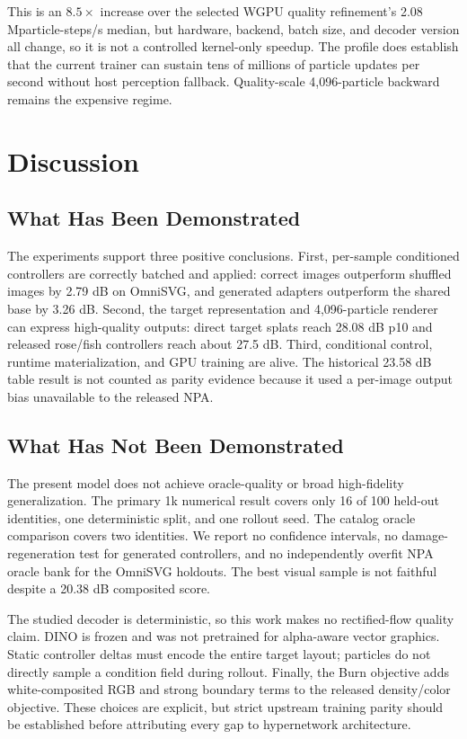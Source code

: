 \documentclass[sigconf,nonacm]{acmart}
\newcommand{\particles}{particle\nobreakdash-steps}
\begin{document}
This is an $8.5\times$ increase over the selected WGPU quality refinement's
2.08 M\particles/s median, but hardware, backend, batch size, and decoder
version all change, so it is not a controlled kernel-only speedup. The profile
does establish that the current trainer can sustain tens of millions of
particle updates per second without host perception fallback. Quality-scale
4,096-particle backward remains the expensive regime.

\section{Discussion}

\subsection{What Has Been Demonstrated}

The experiments support three positive conclusions. First, per-sample
conditioned controllers are correctly batched and applied: correct images
outperform shuffled images by 2.79 dB on OmniSVG, and generated adapters
outperform the shared base by 3.26 dB. Second, the target representation and
4,096-particle renderer can express high-quality outputs: direct target splats
reach 28.08 dB p10 and released rose/fish controllers reach about 27.5 dB.
Third, conditional control, runtime materialization, and GPU training are
alive. The historical 23.58 dB table result is not counted as parity evidence
because it used a per-image output bias unavailable to the released NPA.

\subsection{What Has Not Been Demonstrated}

The present model does not achieve oracle-quality or broad high-fidelity
generalization. The primary 1k numerical result covers only 16 of 100 held-out
identities, one deterministic split, and one rollout seed. The catalog oracle
comparison covers two identities. We report no confidence intervals, no
damage-regeneration test for generated controllers, and no independently
overfit NPA oracle bank for the OmniSVG holdouts. The best visual sample is not
faithful despite a 20.38 dB composited score.

The studied decoder is deterministic, so this work makes no rectified-flow
quality claim. DINO is frozen and was not pretrained for alpha-aware vector
graphics. Static controller deltas must encode the entire target layout;
particles do not directly sample a condition field during rollout. Finally,
the Burn objective adds white-composited RGB and strong boundary terms to the
released density/color objective. These choices are explicit, but strict
upstream training parity should be established before attributing every gap to
hypernetwork architecture.
\end{document}
